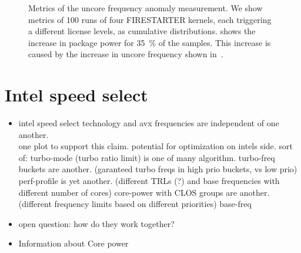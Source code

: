 \begin{figure}[t!]
{    }\hfill
    \caption{Metrics of the uncore frequency anomaly measurement.
    We show metrics of \SI{100}{} runs of four FIRESTARTER kernels, each triggering a different license levels, as cumulative distributions.
     shows the increase in package power for \SI{35}{\percent} of the samples.
    This increase is caused by the increase in uncore frequency shown in~.}
    \label{fig:avx-frequency-uncore-anomaly}
\end{figure}


\section{Intel speed select}
\label{sec:isst}

\begin{itemize}
    \item intel speed select technology and avx frequencies are independent of one another.\\
    one plot to support this claim. potential for optimization on intels side.
    sort of: turbo-mode (turbo ratio limit) is one of many algorithm.
    turbo-freq buckets are another. (garanteed turbo freqs in high prio buckets, vs low prio)
    perf-profile is yet another. (different TRLs (?) and base frequencies with different number of cores)
    core-power with CLOS groups are another. (different frequency limits based on different priorities)
    base-freq
    \item open question: how do they work together?
    \item Information about Core power\cite[pages~87-111]{Intel_2021_HPM}
\end{itemize}

